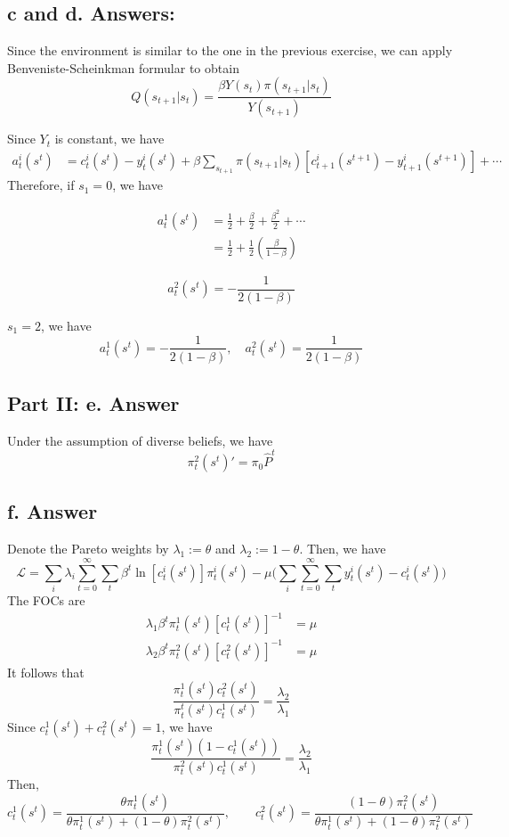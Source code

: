 \documentclass[11pt]{article}
\theoremstyle{definition}
\theoremstyle{boldtitle} %
\numberwithin{equation}{section}
\numberwithin{figure}{section}
\numberwithin{table}{section}
\begin{document}
\subsection{c and d. Answers:} 
Since the environment is similar to the one in the previous exercise, we can apply Benveniste-Scheinkman formular to obtain 
\[
Q(s_{t+1}|s_t) = \frac{\beta Y(s_t) \pi(s_{t+1} | s_t)}{ Y(s_{t+1})}
\]

Since $Y_t$ is constant, we have 
\begin{align*}
a^i_t(s^t) & = c_t^i(s^t) - y_t^i(s^t) + \beta \sum_{s_{t+1}} \pi (s_{t+1}|s_t) [c_{t+1}^i(s^{t+1}) - y_{t+1}^i(s^{t+1})] + \cdots
\end{align*}
Therefore, if 
$s_1 = 0$, we have 

\begin{align*}
a^1_t(s^t) & = \frac{1}{2} + \frac{\beta}{2} + \frac{\beta^2}{2} +  \cdots \\
    & = \frac{1}{2} + \frac{1}{2} (\frac{\beta}{1-\beta})
\end{align*}

\[
a^2_t(s^t) = - \frac{1}{2(1-\beta)}
\]

$s_1 = 2$, we have 
\[
a^1_t(s^t) = -\frac{1}{2(1-\beta)}, \quad a^2_t(s^t) = \frac{1}{2(1-\beta)}
\]


\subsection{Part II: e. Answer} 
Under the assumption of diverse beliefs, we have 
\[
\pi^2_t(s^t)' = \pi_0 \hat{P}^t
\]

\subsection{f. Answer} 
Denote the Pareto weights by 
$\lambda_1 := \theta$ and $\lambda_2 := 1 - \theta$.
Then, we have 
\[
\mathcal{L} = \sum_i \lambda_i \sum_{t=0}^\infty \sum_t \beta^t \ln [c_t^i(s^t)] \pi^i_t(s^t) 
- \mu \bigg(\sum_i \sum_{t=0}^\infty \sum_t y_t^i(s^t) - c_t^i(s^t) \bigg)
\]
The FOCs are 
\begin{align*}
    \lambda_1 \beta^t \pi^1_t(s^t) [c_t^1(s^t)]^{-1} & = \mu \\
    \lambda_2 \beta^t \pi^2_t(s^t) [c_t^2(s^t)]^{-1} & = \mu
\end{align*}
It follows that 
\[
\frac{\pi^1_t(s^t) c_t^2(s^t)
    }{
        \pi^t_t(s^t) c_t^1(s^t)
    } = \frac{\lambda_2}{\lambda_1}
\]
Since $c_t^1(s^t) + c_t^2(s^t) = 1$, we have 
\[
\frac{\pi^1_t(s^t) (1 - c_t^1(s^t))
    }{
        \pi^2_t(s^t) c_t^1(s^t)
    } = \frac{\lambda_2}{\lambda_1}
\]
Then, 
\[
c_t^1(s^t) = \frac{\theta \pi^1_t(s^t)}{\theta \pi^1_t(s^t) + (1- \theta) \pi^2_t(s^t)}, \qquad
c_t^2(s^t) = \frac{(1- \theta) \pi^2_t(s^t)}{\theta \pi^1_t(s^t) + (1- \theta) \pi^2_t(s^t)}
\]
\end{document}

